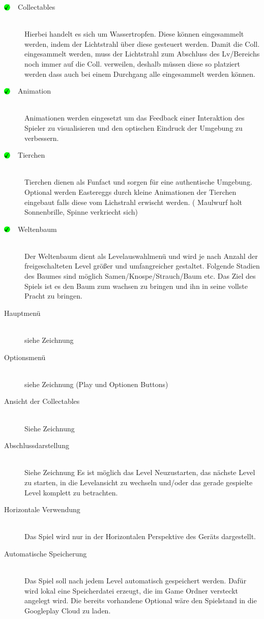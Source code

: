 \begin{description}
\item [$\circledmark\quad$Collectables] \hfill \\
Hierbei handelt es sich um Wassertropfen. Diese können eingesammelt werden, indem der Lichtstrahl über diese gesteuert werden. Damit die Coll. eingesammelt werden, muss der Lichtstrahl zum Abschluss des Lv/Bereichs noch immer auf die Coll. verweilen, deshalb müssen diese so platziert werden dass auch bei einem Durchgang alle eingesammelt werden können.

\item [$\circledmark\quad$Animation] \hfill \\
Animationen werden eingesetzt um das Feedback einer Interaktion des Spieler zu visualisieren und den optischen Eindruck der Umgebung zu verbessern.

\item [$\circledmark\quad$Tierchen] \hfill \\
Tierchen dienen als Funfact und sorgen für eine authentische Umgebung. Optional werden Eastereggs durch kleine Animationen der Tierchen eingebaut falls diese vom Lichstrahl erwischt werden. ( Maulwurf holt Sonnenbrille, Spinne verkriecht sich)

\item [$\circledmark\quad$Weltenbaum] \hfill \\
Der Weltenbaum dient als Levelauswahlmenü und wird je nach Anzahl der freigeschalteten Level größer und umfangreicher gestaltet. Folgende Stadien des Baumes sind möglich Samen/Knospe/Strauch/Baum etc. Das Ziel des Spiels ist es den Baum zum wachsen zu bringen und ihn in seine vollste Pracht zu bringen.

\item [Hauptmenü] \hfill \\
siehe Zeichnung

\item [Optionsmenü] \hfill \\
siehe Zeichnung (Play und Optionen Buttons)

\item [Ansicht der Collectables] \hfill \\
Siehe Zeichnung 

\item [Abschlussdarstellung] \hfill \\
Siehe Zeichnung
Es ist möglich das Level Neuzustarten, das nächste Level zu starten, in die Levelansicht zu wechseln und/oder das gerade gespielte Level komplett zu betrachten. 

\item [Horizontale Verwendung] \hfill \\
Das Spiel wird nur in der Horizontalen Perspektive des Geräts dargestellt.

\item [Automatische Speicherung] \hfill \\
Das Spiel soll nach jedem Level automatisch gespeichert werden. Dafür wird lokal eine Speicherdatei erzeugt, die im Game Ordner versteckt angelegt wird. Die bereits vorhandene Optional wäre den Spielstand in die Googleplay Cloud zu laden.

\end{description}


